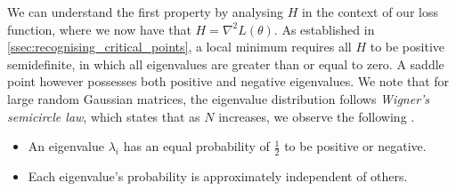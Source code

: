 We can understand the first property by analysing $H$ in the context of our loss function, where we now have that $H = \nabla^2 L(\theta)$. As established in \cref{ssec:recognising_critical_points}, a local minimum requires all $H$ to be positive semidefinite, in which all eigenvalues are greater than or equal to zero. A saddle point however possesses both positive and negative eigenvalues. We note that for large random Gaussian matrices, the eigenvalue distribution follows \textit{Wigner's semicircle law}, which states that as $N$ increases, we observe the following \citep{wigner1958distribution, dauphin2014sfn}.
\begin{itemize}
    \item An eigenvalue $\lambda_i$ has an equal probability of $\frac{1}{2}$ to be positive or negative. 
    \item Each eigenvalue's probability is approximately independent of others.
\end{itemize}

